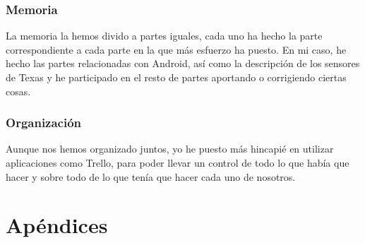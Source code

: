 \subsubsection{Memoria} 
La memoria la hemos divido a partes iguales, cada uno ha hecho la parte correspondiente a cada parte en la que más esfuerzo ha puesto. En mi caso, he hecho las partes relacionadas con Android, así como la descripción de los sensores de Texas y he participado en el resto de partes aportando o corrigiendo ciertas cosas.

\subsubsection{Organización}
Aunque nos hemos organizado juntos, yo he puesto más hincapié en utilizar aplicaciones como Trello, para poder llevar un control de todo lo que había que hacer y sobre todo de lo que tenía que hacer cada uno de nosotros.
\newpage
\section{Apéndices}
